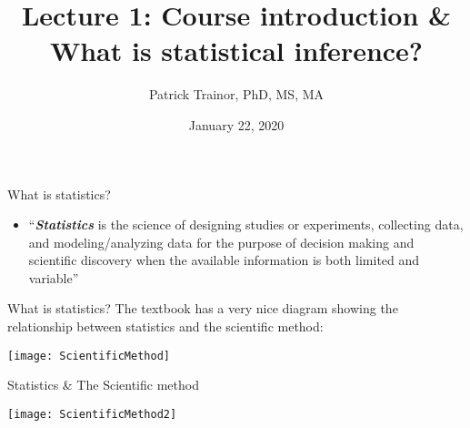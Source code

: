 \documentclass[xcolor=dvipsnames]{beamer}
\title[Lecture 1]{Lecture 1: Course introduction \& What is statistical inference?}
\author[Patrick Trainor]{Patrick Trainor, PhD, MS, MA}
\institute[NMSU]{New Mexico State University}
\date{January 22, 2020}
\begin{document}
	
\begin{frame}
    \maketitle
\end{frame}

\begin{frame}{What is statistics?}
	\begin{itemize}
		\item ``\textbf{\textit{Statistics}} is the science of designing studies or experiments, collecting data, and modeling/analyzing data for the purpose of decision making and scientific discovery when the available information is both limited and variable''
	\end{itemize}
\end{frame}

\begin{frame}{What is statistics?}
	\vspace{-12pt}
	The textbook has a very nice diagram showing the relationship between statistics and the scientific method: \vspace{5pt}
	
	\begin{center}
		\texttt{[image: ScientificMethod]}
	\end{center}
\end{frame}

\begin{frame}{Statistics \& The Scientific method}
	\vspace{-12pt}
	\begin{center}
		\texttt{[image: ScientificMethod2]}
	\end{center}
\end{frame}
\end{document}
